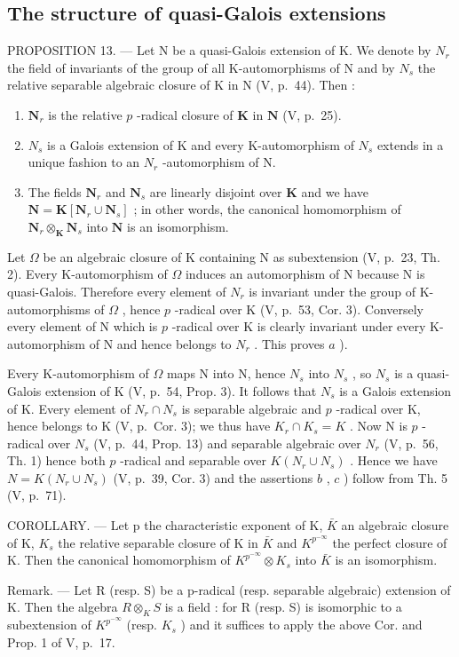 \subsection{The structure of quasi-Galois extensions}

PROPOSITION 13. --- Let N be a quasi-Galois extension of K. We denote by \(N_{r}\) the field of invariants of the group of all K-automorphisms of N and by \(N_{s}\) the relative separable algebraic closure of K in N (V, p.~44). Then :

\begin{enumerate}
\def\labelenumi{\alph{enumi})}
\item
  \(\mathbf{N}_r\) is the relative \(p\) -radical closure of \(\mathbf{K}\) in \(\mathbf{N}\) (V, p.~25).
\item
  \(N_{s}\) is a Galois extension of K and every K-automorphism of \(N_{s}\) extends in a unique fashion to an \(N_{r}\) -automorphism of N.
\item
  The fields \(\mathbf{N}_r\) and \(\mathbf{N}_s\) are linearly disjoint over \(\mathbf{K}\) and we have \(\mathbf{N} = \mathbf{K}[\mathbf{N}_r \cup \mathbf{N}_s]\) ; in other words, the canonical homomorphism of \(\mathbf{N}_r \otimes_{\mathbf{K}} \mathbf{N}_s\) into \(\mathbf{N}\) is an isomorphism.
\end{enumerate}

Let \(\Omega\) be an algebraic closure of K containing N as subextension (V, p.~23, Th. 2). Every K-automorphism of \(\Omega\) induces an automorphism of N because N is quasi-Galois. Therefore every element of \(N_r\) is invariant under the group of K-automorphisms of \(\Omega\) , hence \(p\) -radical over K (V, p.~53, Cor. 3). Conversely every element of N which is \(p\) -radical over K is clearly invariant under every K-automorphism of N and hence belongs to \(N_r\) . This proves \(a\) ).

Every K-automorphism of \(\Omega\) maps N into N, hence \(N_s\) into \(N_s\) , so \(N_s\) is a quasi-Galois extension of K (V, p.~54, Prop. 3). It follows that \(N_s\) is a Galois extension of K. Every element of \(N_r \cap N_s\) is separable algebraic and \(p\) -radical over K, hence belongs to K (V, p.~Cor. 3); we thus have \(K_r \cap K_s = K\) . Now N is \(p\) -radical over \(N_s\) (V, p.~44, Prop. 13) and separable algebraic over \(N_r\) (V, p.~56, Th. 1) hence both \(p\) -radical and separable over \(K(N_r \cup N_s)\) . Hence we have \(N = K(N_r \cup N_s)\) (V, p.~39, Cor. 3) and the assertions \(b\) , \(c\) ) follow from Th. 5 (V, p.~71).

COROLLARY. --- Let p the characteristic exponent of K, \(\bar{K}\) an algebraic closure of K, \(K_{s}\) the relative separable closure of K in \(\bar{K}\) and \(K^{p^{-\infty}}\) the perfect closure of K. Then the canonical homomorphism of \(K^{p^{-\infty}} \otimes K_{s}\) into \(\bar{K}\) is an isomorphism.

Remark. --- Let R (resp. S) be a p-radical (resp. separable algebraic) extension of K. Then the algebra \(R \otimes_{K} S\) is a field : for R (resp. S) is isomorphic to a subextension of \(K^{p^{-\infty}}\) (resp. \(K_{s}\) ) and it suffices to apply the above Cor. and Prop. 1 of V, p.~17.

